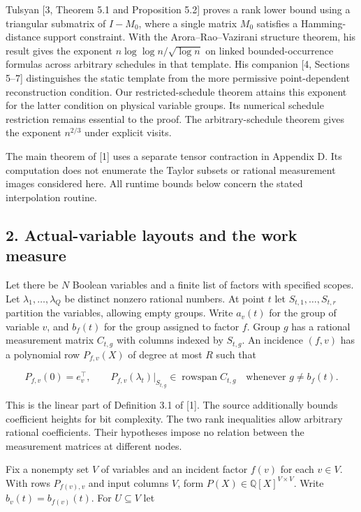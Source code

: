 \documentclass[
  10pt,
]{article}
\begin{document}
Tulsyan {[}3, Theorem 5.1 and Proposition 5.2{]} proves a rank lower
bound using a triangular submatrix of \(I-M_0\), where a single matrix
\(M_0\) satisfies a Hamming-distance support constraint. With the
Arora--Rao--Vazirani structure theorem, his result gives the exponent
\(n\log\log n/\sqrt{\log n}\) on linked bounded-occurrence formulas
across arbitrary schedules in that template. His companion {[}4,
Sections 5--7{]} distinguishes the static template from the more
permissive point-dependent reconstruction condition. Our
restricted-schedule theorem attains this exponent for the latter
condition on physical variable groups. Its numerical schedule
restriction remains essential to the proof. The arbitrary-schedule
theorem gives the exponent \(n^{2/3}\) under explicit visits.

The main theorem of {[}1{]} uses a separate tensor contraction in
Appendix D. Its computation does not enumerate the Taylor subsets or
rational measurement images considered here. All runtime bounds below
concern the stated interpolation routine.

\subsection{2. Actual-variable layouts and the work
measure}\label{actual-variable-layouts-and-the-work-measure}

Let there be \(N\) Boolean variables and a finite list of factors with
specified scopes. Let \(\lambda_1,\ldots,\lambda_Q\) be distinct nonzero
rational numbers. At point \(t\) let \(S_{t,1},\ldots,S_{t,r}\)
partition the variables, allowing empty groups. Write \(a_v(t)\) for the
group of variable \(v\), and \(b_f(t)\) for the group assigned to factor
\(f\). Group \(g\) has a rational measurement matrix \(C_{t,g}\) with
columns indexed by \(S_{t,g}\). An incidence \((f,v)\) has a polynomial
row \(P_{f,v}(X)\) of degree at most \(R\) such that

\[
 P_{f,v}(0)=e_v^\top,\qquad
 P_{f,v}(\lambda_t)|_{S_{t,g}}\in\operatorname{rowspan}C_{t,g}
             \quad\text{whenever } g\ne b_f(t).                       \tag{1}
\]

This is the linear part of Definition 3.1 of {[}1{]}. The source
additionally bounds coefficient heights for bit complexity. The two rank
inequalities allow arbitrary rational coefficients. Their hypotheses
impose no relation between the measurement matrices at different nodes.

Fix a nonempty set \(V\) of variables and an incident factor \(f(v)\)
for each \(v\in V\). With rows \(P_{f(v),v}\) and input columns \(V\),
form \(P(X)\in\mathbb Q[X]^{V\times V}\). Write \(b_v(t)=b_{f(v)}(t)\).
For \(U\subseteq V\) let
\end{document}
